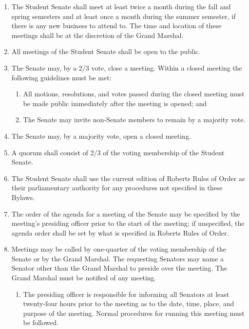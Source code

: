 
\begin{enumerate}
\item The Student Senate shall meet at least twice a month during the fall and spring semesters and at least once a month during the summer semester, if there is any new business to attend to. The time and location of these meetings shall be at the discretion of the Grand Marshal.
\item All meetings of the Student Senate shall be open to the public.
\item The Senate may, by a 2/3 vote, close a meeting. Within a closed meeting the following guidelines must be met:
  \begin{enumerate}
  \item All motions, resolutions, and votes passed during the closed meeting must be made public immediately after the meeting is opened; and
  \item The Senate may invite non-Senate members to remain by a majority vote.
  \end{enumerate}
\item The Senate may, by a majority vote, open a closed meeting.
\item A quorum shall consist of 2/3 of the voting membership of the Student Senate.
\item The Student Senate shall use the current edition of Roberts Rules of Order as their parliamentary authority for any procedures not specified in these Bylaws.
\item The order of the agenda for a meeting of the Senate may be specified by the meeting’s presiding officer prior to the start of the meeting; if unspecified, the agenda order shall be set by what is specified in Roberts Rules of Order.
\item Meetings may be called by one-quarter of the voting membership of the Senate or by the Grand Marshal. The requesting Senators may name a Senator other than the Grand Marshal to preside over the meeting. The Grand Marshal must be notified of any meeting.
  \begin{enumerate}
  \item The presiding officer is responsible for informing all Senators at least twenty-four hours prior to the meeting as to the date, time, place, and purpose of the meeting. Normal procedures for running this meeting must be followed.
  \end{enumerate}
\end{enumerate}

